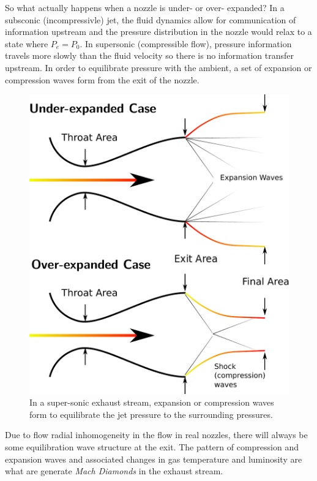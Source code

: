 \documentclass[twocolumn]{memoir} %
\begin{document}
So what actually happens when a nozzle is under- or over- expanded?  In a subsconic
(incompressivle) jet, the fluid dynamics allow for communication of information upstream
and the pressure distribution in the nozzle would relax to a state where $P_e = P_0$. 
In supersonic (compressible flow), pressure information travels more slowly than the fluid
velocity so there is no information transfer upstream.  In order to equilibrate pressure with
the ambient, a set of expansion or compression waves form from the exit of the nozzle.  

\begin{figure}[h]
    \includegraphics[width=0.9\columnwidth]{overExpanded}
    \caption{In a super-sonic exhaust stream, expansion or compression waves form to
    equilibrate the jet pressure to the surrounding pressures.}
\end{figure}

Due to flow radial inhomogeneity in the flow in real nozzles, there will always be some
equilibration wave structure at the exit.  The pattern of compression and expansion waves
and associated changes in gas temperature and luminosity are what are generate \emph{Mach
Diamonds} in the exhaust stream.
\end{document}

